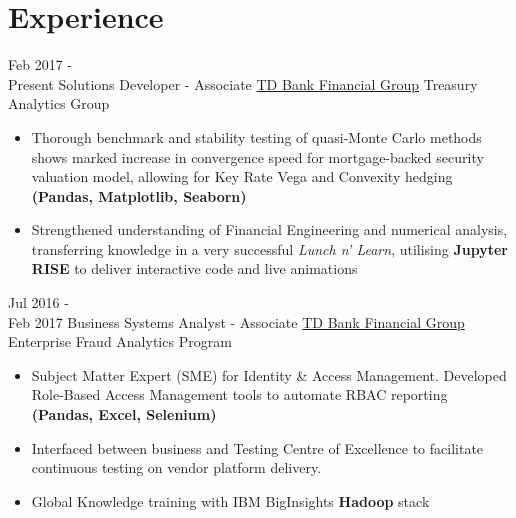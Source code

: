 \documentclass[letterpaper]{twentysecondcv} %
\begin{document}
\section{Experience}

\begin{twenty} %
	\twentyitem
    	{Feb 2017 - \\ Present}
        {Solutions Developer - Associate}
        {\href{http://www.td.com/}{TD Bank Financial Group}}
        {Treasury Analytics Group}
        {
        {\begin{itemize}
        \item Thorough benchmark and stability testing of quasi-Monte Carlo methods shows marked increase in convergence speed for mortgage-backed security valuation model, allowing for Key Rate Vega and Convexity hedging \textbf{(Pandas, Matplotlib, Seaborn)}
        \item Strengthened understanding of Financial Engineering and numerical analysis, transferring knowledge in a very successful \emph{Lunch n' Learn}, utilising \textbf{Jupyter RISE} to deliver interactive code and live animations
    \end{itemize}}
        }
        
    \twentyitem
   		{Jul 2016 - \\
   		Feb 2017}
        {Business Systems Analyst - Associate}
        {\href{http://www.td.com/}{TD Bank Financial Group}}
        {Enterprise Fraud Analytics Program}
        {
        {\begin{itemize}
        \item Subject Matter Expert (SME) for Identity \& Access Management. Developed Role-Based Access Management tools to automate RBAC reporting \textbf{(Pandas, Excel, Selenium)}
        \item Interfaced between business and Testing Centre of Excellence to facilitate continuous testing on vendor platform delivery.
        \item Global Knowledge training with IBM BigInsights \textbf{Hadoop} stack
    \end{itemize}}
        }
        

\end{twenty}
\end{document}
